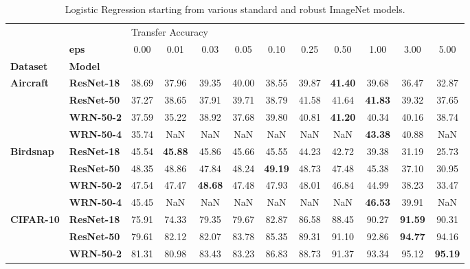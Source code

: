 \begin{table}
\centering
\caption{Logistic Regression starting from various standard and robust ImageNet models.}
\label{app:small-datasets-LogisticRegression}
\begin{tabular}{l|l|cccccccccc}
\toprule
       & {} & \multicolumn{10}{l}{Transfer Accuracy} \\
       & \textbf{eps} &              0.00 &  0.01 &  0.03 &  0.05 &  0.10 &  0.25 &  0.50 &  1.00 &  3.00 &  5.00 \\
\textbf{Dataset} & \textbf{Model} &                   &       &       &       &       &       &       &       &       &       \\
\midrule
\multirow{4}{*}{\textbf{Aircraft}} & \textbf{ResNet-18} &             38.69 & 37.96 & 39.35 & 40.00 & 38.55 & 39.87 & \textbf{41.40} & 39.68 & 36.47 & 32.87 \\
       & \textbf{ResNet-50} &             37.27 & 38.65 & 37.91 & 39.71 & 38.79 & 41.58 & 41.64 & \textbf{41.83} & 39.32 & 37.65 \\
       & \textbf{WRN-50-2} &             37.59 & 35.22 & 38.92 & 37.68 & 39.80 & 40.81 & \textbf{41.20} & 40.34 & 40.16 & 38.74 \\
       & \textbf{WRN-50-4} &             35.74 &   NaN &   NaN &   NaN &   NaN &   NaN &   NaN & \textbf{43.38} & 40.88 &   NaN \\
\cline{1-12}
\multirow{4}{*}{\textbf{Birdsnap}} & \textbf{ResNet-18} &             45.54 & \textbf{45.88} & 45.86 & 45.66 & 45.55 & 44.23 & 42.72 & 39.38 & 31.19 & 25.73 \\
       & \textbf{ResNet-50} &             48.35 & 48.86 & 47.84 & 48.24 & \textbf{49.19} & 48.73 & 47.48 & 45.38 & 37.10 & 30.95 \\
       & \textbf{WRN-50-2} &             47.54 & 47.47 & \textbf{48.68} & 47.48 & 47.93 & 48.01 & 46.84 & 44.99 & 38.23 & 33.47 \\
       & \textbf{WRN-50-4} &             45.45 &   NaN &   NaN &   NaN &   NaN &   NaN &   NaN & \textbf{46.53} & 39.91 &   NaN \\
\cline{1-12}
\multirow{4}{*}{\textbf{CIFAR-10}} & \textbf{ResNet-18} &             75.91 & 74.33 & 79.35 & 79.67 & 82.87 & 86.58 & 88.45 & 90.27 & \textbf{91.59} & 90.31 \\
       & \textbf{ResNet-50} &             79.61 & 82.12 & 82.07 & 83.78 & 85.35 & 89.31 & 91.10 & 92.86 & \textbf{94.77} & 94.16 \\
       & \textbf{WRN-50-2} &             81.31 & 80.98 & 83.43 & 83.23 & 86.83 & 88.73 & 91.37 & 93.34 & 95.12 & \textbf{95.19} \\

\end{tabular}
\end{table}
